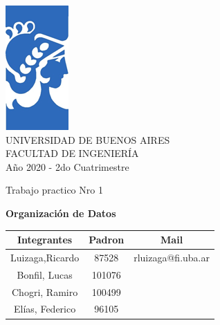 \documentclass[10pt,a4paper]{article}
\begin{document}

\begin{titlepage}

\begin{center}

\includegraphics[scale=1.3]{./Logo.png} 
\\
\vspace*{0.15in}
UNIVERSIDAD DE BUENOS AIRES\\
\vspace*{0.15in}
FACULTAD DE INGENIERÍA\\
\vspace*{0.15in}
Año 2020 - 2do Cuatrimestre\\
\vspace*{0.3in}
\begin{large}
Trabajo practico Nro 1\\
\end{large}
\vspace*{0.3in}
\begin{LARGE}
\textbf{Organización de Datos} \\
\end{LARGE}
\vspace*{0.3in}
\begin{tabular}{|c|c|c|}
\hline 
Integrantes & Padron & Mail \\ 
\hline 
Luizaga,Ricardo & 87528 & rluizaga@fi.uba.ar \\ 
\hline
Bonfil, Lucas & 101076 & \\
\hline
Chogri, Ramiro & 100499 & \\
\hline
Elías, Federico & 96105 & \\
\hline

\end{tabular}

\vspace*{0.3in}

\end{center}

\end{titlepage}


\clearpage

\tableofcontents 

\clearpage
% 
% 
\end{document}
